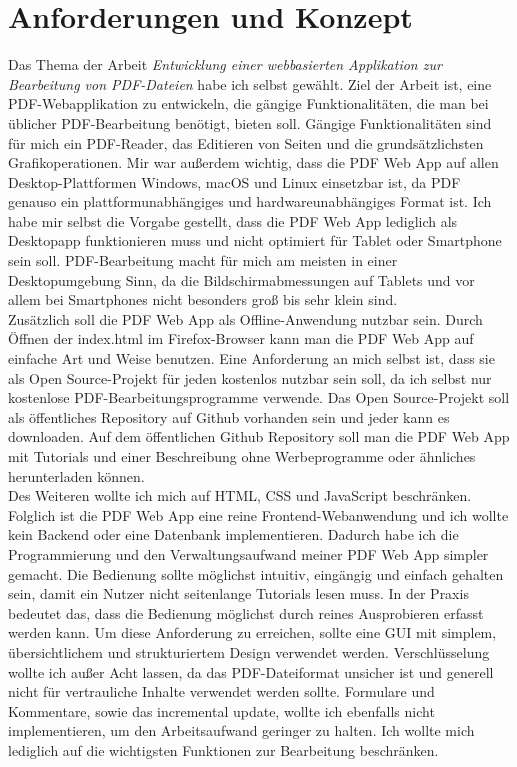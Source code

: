 \chapter{Anforderungen und Konzept}
Das Thema der Arbeit \textit{\glqq Entwicklung einer webbasierten Applikation zur Bearbeitung von PDF-Dateien\grqq} habe ich selbst gewählt. Ziel der Arbeit ist, eine PDF-Webapplikation zu entwickeln, die gängige Funktionalitäten, die man bei üblicher PDF-Bearbeitung benötigt, bieten soll. Gängige Funktionalitäten sind für mich ein PDF-Reader, das Editieren von Seiten und die grundsätzlichsten Grafikoperationen. Mir war außerdem wichtig, dass die PDF Web App auf allen Desktop-Plattformen Windows, macOS und Linux einsetzbar ist, da PDF genauso ein plattformunabhängiges und hardwareunabhängiges Format ist. Ich habe mir selbst die Vorgabe gestellt, dass die PDF Web App lediglich als Desktopapp funktionieren muss und nicht optimiert für Tablet oder Smartphone sein soll. PDF-Bearbeitung macht für mich am meisten in einer Desktopumgebung Sinn, da die Bildschirmabmessungen auf Tablets und vor allem bei Smartphones nicht besonders groß bis sehr klein sind. \\
Zusätzlich soll die PDF Web App als Offline-Anwendung nutzbar sein. Durch Öffnen der index.html im Firefox-Browser kann man die PDF Web App auf einfache Art und Weise benutzen. Eine Anforderung an mich selbst ist, dass sie als Open Source-Projekt für jeden kostenlos nutzbar sein soll, da ich selbst nur kostenlose PDF-Bearbeitungsprogramme verwende. Das Open Source-Projekt soll als öffentliches Repository auf Github vorhanden sein und jeder kann es downloaden. Auf dem öffentlichen Github Repository soll man die PDF Web App mit Tutorials und einer Beschreibung ohne Werbeprogramme oder ähnliches herunterladen können. \\
Des Weiteren wollte ich mich auf HTML, CSS und JavaScript beschränken. Folglich ist die PDF Web App eine reine Frontend-Webanwendung und ich wollte kein Backend oder eine Datenbank implementieren. Dadurch habe ich die Programmierung und den Verwaltungsaufwand meiner PDF Web App simpler gemacht. Die Bedienung sollte möglichst intuitiv, eingängig und einfach gehalten sein, damit ein Nutzer nicht seitenlange Tutorials lesen muss. In der Praxis bedeutet das, dass die Bedienung möglichst durch reines Ausprobieren erfasst werden kann. Um diese Anforderung zu erreichen, sollte eine GUI mit simplem, übersichtlichem und strukturiertem Design verwendet werden. Verschlüsselung wollte ich außer Acht lassen, da das PDF-Dateiformat unsicher ist und generell nicht für vertrauliche Inhalte verwendet werden sollte. Formulare und Kommentare, sowie das incremental update, wollte ich ebenfalls nicht implementieren, um den Arbeitsaufwand geringer zu halten. Ich wollte mich lediglich auf die wichtigsten Funktionen zur Bearbeitung beschränken.

